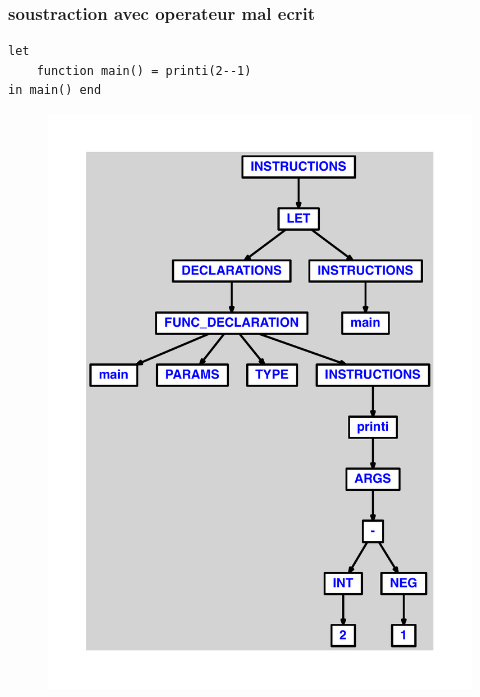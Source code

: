 \documentclass{article}
\begin{document}
\subsubsection{soustraction avec operateur mal ecrit}
\begin{lstlisting}
let
	function main() = printi(2--1)
in main() end
\end{lstlisting}
\newpage
\begin{figure}[H]
\centering
\includegraphics[max width=\textwidth]{ast/ast_23.pdf}
\end{figure}
\newpage
\end{document}
